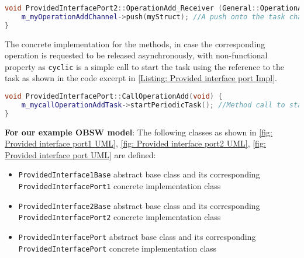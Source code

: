 \begin{Listing}
\begin{lstlisting}[language=C++]
void ProvidedInterfacePort2::OperationAdd_Receiver (General::OperationAddStruct_InterfaceB myStruct) {
	m_myOperationAddChannel->push(myStruct); //A push onto the task channel
}
\end{lstlisting}
\caption{Code excerpt from the generated code for operation \texttt{OperationAdd} access in \texttt{Provided\allowbreak Interface\allowbreak Port2} which is called asynchronously}
\label{Listing: Provided interface port2 Impl}
\end{Listing}

The concrete implementation for the methods, in case the corresponding operation is requested to be released asynchronously, with non-functional property as \texttt{cyclic} is a simple call to start the task using the reference to the task as shown in the code excerpt in \cref{Listing: Provided interface port Impl}.

\begin{Listing}
\begin{lstlisting}[language=C++]
void ProvidedInterfacePort::CallOperationAdd(void) {
	m_mycallOperationAddTask->startPeriodicTask(); //Method call to start the task
}
\end{lstlisting}
\caption{Code excerpt from the generated code for operation \texttt{CallOperationAdd} in \texttt{Provided\allowbreak Interface\allowbreak Port} which has non-functional property set as \texttt{Cyclic}}
\label{Listing: Provided interface port Impl}
\end{Listing}

\textbf{For our example OBSW model}: The following classes as shown in \cref{fig: Provided interface port1 UML}, \cref{fig: Provided interface port2 UML}, \cref{fig: Provided interface port UML} are defined:
\begin{itemize}
\item \texttt{Provided\allowbreak Interface1\allowbreak Base} abstract base class and its corresponding \texttt{Provided\allowbreak Interface\allowbreak Port1} concrete implementation class
\item \texttt{Provided\allowbreak Interface2\allowbreak Base} abstract base class and its corresponding \texttt{Provided\allowbreak Interface\allowbreak Port2} concrete implementation class
\item \texttt{Provided\allowbreak Interface\allowbreak Port} abstract base class and its corresponding \texttt{Provided\allowbreak Interface\allowbreak Port} concrete implementation class 
\end{itemize} 


